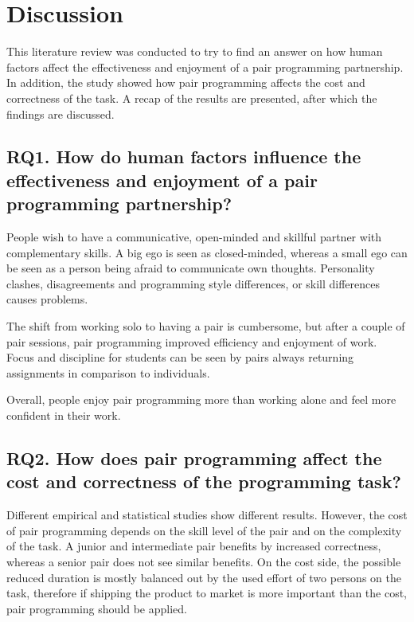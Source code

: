 \documentclass[conference]{IEEEtran}
\begin{document}
\section{Discussion}

This literature review was conducted to try to find an answer on how human factors affect the effectiveness and enjoyment of a pair programming partnership. In addition, the study showed how pair programming affects the cost and correctness of the task. A recap of the results are presented, after which the findings are discussed. 

\subsection{RQ1. How do human factors influence the effectiveness and enjoyment of a pair programming partnership?}
    
People wish to have a communicative, open-minded and skillful partner with complementary skills. A big ego is seen as closed-minded, whereas a small ego can be seen as a person being afraid to communicate own thoughts. Personality clashes, disagreements and programming style differences, or skill differences causes problems.

The shift from working solo to having a pair is cumbersome, but after a couple of pair sessions, pair programming improved efficiency and enjoyment of work. Focus and discipline for students can be seen by pairs always returning assignments in comparison to individuals.

Overall, people enjoy pair programming more than working alone and feel more confident in their work.

    
\subsection{RQ2. How does pair programming affect the cost and correctness of the programming task?}

Different empirical and statistical studies show different results. However, the cost of pair programming depends on the skill level of the pair and on the complexity of the task. A junior and intermediate pair benefits by increased correctness, whereas a senior pair does not see similar benefits. On the cost side, the possible reduced duration is mostly balanced out by the used effort of two persons on the task, therefore if shipping the product to market is more important than the cost, pair programming should be applied.
\end{document}
